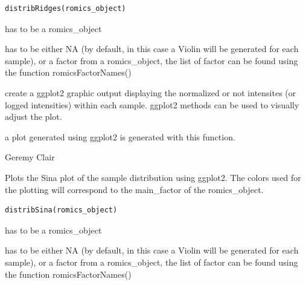 \documentclass[a4paper]{book}
\begin{document}
%
\begin{Usage}
\begin{verbatim}
distribRidges(romics_object)
\end{verbatim}
\end{Usage}
%
\begin{Arguments}
\begin{ldescription}
\item[\code{romics\_object}] has to be a romics\_object

\item[\code{aggregate\_by}] has to be either NA (by default, in this case a Violin will be generated for each sample), or a factor from a romics\_object, the list of factor can be found using the function romicsFactorNames()
\end{ldescription}
\end{Arguments}
%
\begin{Details}
create a ggplot2 graphic output displaying the normalized or not intensites (or logged intensities) within each sample. ggplot2 methods can be used to visually adjust the plot.
\end{Details}
%
\begin{Value}
a plot generated using ggplot2 is generated with this function.
\end{Value}
%
\begin{Author}
Geremy Clair
\end{Author}
%
\begin{Description}
Plots the Sina plot of the sample distribution using ggplot2. The colors used for the plotting will correspond to the main\_factor of the romics\_object.
\end{Description}
%
\begin{Usage}
\begin{verbatim}
distribSina(romics_object)
\end{verbatim}
\end{Usage}
%
\begin{Arguments}
\begin{ldescription}
\item[\code{romics\_object}] has to be a romics\_object

\item[\code{aggregate\_by}] has to be either NA (by default, in this case a Violin will be generated for each sample), or a factor from a romics\_object, the list of factor can be found using the function romicsFactorNames()
\end{ldescription}
\end{Arguments}
\end{document}
